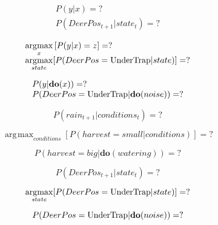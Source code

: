 \documentclass[12pt,letterpaper]{article}
\DeclareMathOperator*{\argmax}{\arg\!\max}
\begin{document}
{\Large
\[ 
\begin{array}{l}
P(y|x) = ?\\
P(DeerPos_{t+1} | state_t) = ?
\end{array}
\]
%

\[ 
\begin{array}{l}
\displaystyle\argmax_x \left[ P(y|x)=z \right] = ?\\
\displaystyle\argmax_{state} [P(DeerPos=\textnormal{UnderTrap} | state)] = ?
\end{array}
\]

\[ 
\begin{array}{l}
P(y|\mathbf{do}(x)) = ?\\
P(DeerPos=\textnormal{UnderTrap} | \textbf{do}(noise)) = ?
\end{array}
\]

\[
P(rain_{t+1} | conditions_t) = ?
\]


\[
\argmax_{conditions} [P(harvest=small | conditions)] = ?
\]

\[
P(harvest=big | \textbf{do}(watering)) = ?
\]


\[
P(DeerPos_{t+1} | state_t) = ?
\]


\[
\argmax_{state} [P(DeerPos=\textnormal{UnderTrap} | state)] = ?
\]

\[
P(DeerPos=\textnormal{UnderTrap} | \textbf{do}(noise)) = ?
\]

}
\end{document}
